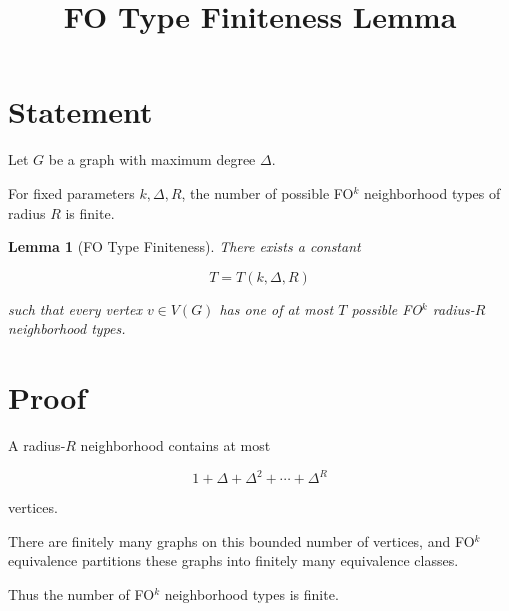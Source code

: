 \documentclass[11pt]{article}
\title{FO Type Finiteness Lemma}
\date{}
\newtheorem{lemma}{Lemma}
\begin{document}
\maketitle

\section*{Statement}

Let \(G\) be a graph with maximum degree \(\Delta\).

For fixed parameters \(k,\Delta,R\), the number of possible
FO\(^k\) neighborhood types of radius \(R\) is finite.

\begin{lemma}[FO Type Finiteness]

There exists a constant

\[
T = T(k,\Delta,R)
\]

such that every vertex \(v \in V(G)\) has one of at most \(T\)
possible FO\(^k\) radius-\(R\) neighborhood types.

\end{lemma}

\section*{Proof}

A radius-\(R\) neighborhood contains at most

\[
1 + \Delta + \Delta^2 + \cdots + \Delta^R
\]

vertices.

There are finitely many graphs on this bounded number of vertices,
and FO\(^k\) equivalence partitions these graphs into finitely
many equivalence classes.

Thus the number of FO\(^k\) neighborhood types is finite.
\end{document}
